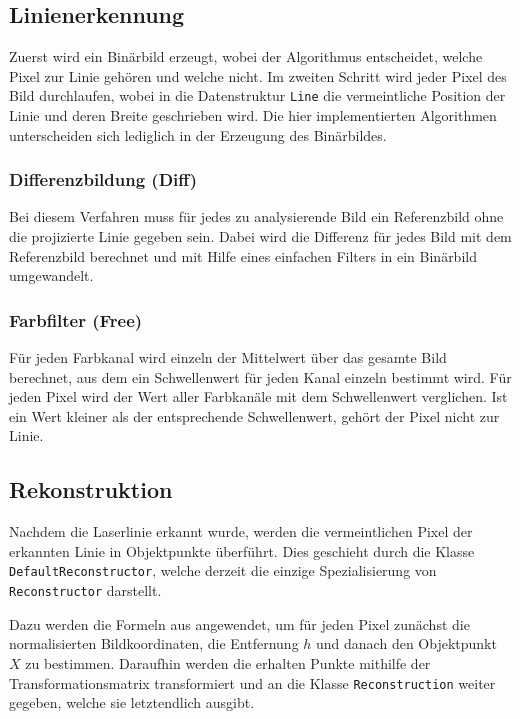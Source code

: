 \documentclass[ngerman,a4paper,parskip=half]{scrartcl}
\begin{document}
\subsection{Linienerkennung}

Zuerst wird ein Binärbild erzeugt, wobei der Algorithmus entscheidet, welche Pixel zur Linie gehören und welche nicht. Im zweiten Schritt wird jeder Pixel des Bild durchlaufen, wobei in die Datenstruktur \texttt{Line} die vermeintliche Position der Linie und deren Breite geschrieben wird. Die hier implementierten Algorithmen unterscheiden sich lediglich in der Erzeugung des Binärbildes.

\subsubsection{Differenzbildung (Diff)}

Bei diesem Verfahren muss für jedes zu analysierende Bild ein Referenzbild ohne die projizierte Linie gegeben sein. Dabei wird die Differenz für jedes Bild mit dem Referenzbild berechnet und mit Hilfe eines einfachen Filters in ein Binärbild umgewandelt.

\subsubsection{Farbfilter (Free)}

Für jeden Farbkanal wird einzeln der Mittelwert über das gesamte Bild berechnet, aus dem ein Schwellenwert für jeden Kanal einzeln bestimmt wird. Für jeden Pixel wird der Wert aller Farbkanäle mit dem Schwellenwert verglichen. Ist ein Wert kleiner als der entsprechende Schwellenwert, gehört der Pixel nicht zur Linie.

\subsection{Rekonstruktion}

Nachdem die Laserlinie erkannt wurde, werden die vermeintlichen Pixel der erkannten Linie in Objektpunkte überführt. Dies geschieht durch die Klasse \texttt{DefaultReconstructor}, welche derzeit die einzige Spezialisierung von \texttt{Reconstructor} darstellt.

Dazu werden die Formeln aus  angewendet, um für jeden Pixel zunächst die normalisierten Bildkoordinaten, die Entfernung $h$ und danach den Objektpunkt $X$ zu bestimmen. Daraufhin werden die erhalten Punkte mithilfe der Transformationsmatrix transformiert und an die Klasse \texttt{Reconstruction} weiter gegeben, welche sie letztendlich ausgibt.
\end{document}
